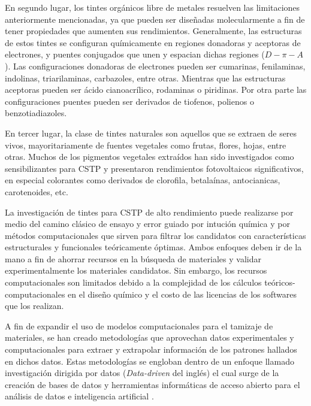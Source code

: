 En segundo lugar, los tintes orgánicos libre de metales resuelven las limitaciones anteriormente mencionadas, ya que pueden ser diseñadas molecularmente a fin de tener propiedades que aumenten sus rendimientos. Generalmente, las estructuras de estos tintes se configuran químicamente en regiones donadoras y aceptoras de electrones, y puentes conjugados que unen y espacian dichas regiones ($D-\pi-A$). Las configuraciones donadoras de electrones pueden ser cumarinas, fenilaminas, indolinas, triarilaminas, carbazoles, entre otras. Mientras que las estructuras aceptoras pueden ser ácido cianoacrílico, rodaminas o piridinas. Por otra parte las configuraciones puentes pueden ser derivados de tiofenos, polienos o benzotiadiazoles. 

En tercer lugar, la clase de tintes naturales son aquellos que se extraen de seres vivos, mayoritariamente de fuentes vegetales como frutas, flores, hojas, entre otras. Muchos de los pigmentos vegetales extraídos han sido investigados como sensibilizantes para CSTP y presentaron rendimientos fotovoltaicos significativos, en especial colorantes como derivados de clorofila, betalaínas, antocianicas, carotenoides, etc. 


La investigación de tintes para CSTP de alto rendimiento puede realizarse por medio del camino clásico de ensayo y error guiado por intución química y por métodos computacionales que sirven para filtrar los candidatos con características estructurales y funcionales teóricamente óptimas. Ambos enfoques deben ir de la mano a fin de ahorrar recursos en la búsqueda de materiales y validar experimentalmente los materiales candidatos. Sin embargo, los recursos computacionales son limitados debido a la complejidad de los cálculos teóricos-computacionales en el diseño químico y el costo de las licencias de los softwares que los realizan.

A fin de expandir el uso de modelos computacionales para el tamizaje de materiales, se han creado metodologías que aprovechan datos experimentales y computacionales para extraer y extrapolar información de los patrones hallados en dichos datos. Estas metodologías se engloban dentro de un enfoque llamado investigación dirigida por datos (\textit{Data-driven} del inglés) el cual surge de la creación de bases de datos y herramientas informáticas de acceso abierto para el análisis de datos e inteligencia artificial \cite{himanen2019data}. 

